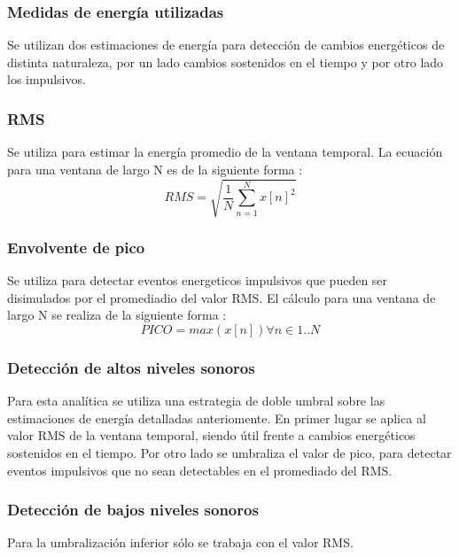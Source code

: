 \documentclass{article}
\begin{document}
\subsubsection{Medidas de energía utilizadas}
Se utilizan dos estimaciones de energía para detección de cambios energéticos de distinta naturaleza, por un lado cambios sostenidos en el tiempo y por otro lado los impulsivos.

\subsubsection*{RMS}
Se utiliza para estimar la energía promedio de la ventana temporal. La ecuación para una ventana de largo N es de la siguiente forma \cite[Chapter~4]{Lerch:2012:IAC:2392638}:
\begin{equation}
RMS = \sqrt{\frac{1}{N}\sum_{n=1}^{N} x[n]^2}
\end{equation}

\subsubsection*{Envolvente de pico}
Se utiliza para detectar eventos energeticos impulsivos que pueden ser disimulados por el promediadio del valor RMS. El cálculo para una ventana de largo N se realiza de la siguiente forma \cite[Chapter~4]{Lerch:2012:IAC:2392638}:
\begin{equation}
PICO = max(x[n])\forall n \in 1..N 
\end{equation}

\subsubsection{Detección de altos niveles sonoros}
Para esta analítica se utiliza una estrategia de doble umbral sobre las estimaciones de energía detalladas anteriomente. En primer lugar se aplica al valor RMS de la ventana temporal, siendo útil frente a cambios energéticos sostenidos en el tiempo. Por otro lado se umbraliza el valor de pico, para detectar eventos impulsivos que no sean detectables en el promediado del RMS.

\subsubsection{Detección de bajos niveles sonoros}
Para la umbralización inferior sólo se trabaja con el valor RMS.
\end{document}
